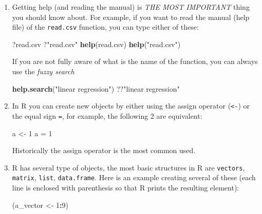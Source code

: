 \documentclass[]{book}
\newenvironment{Shaded}{\begin{snugshade}}{\end{snugshade}}
\newcommand{\DecValTok}[1]{\textcolor[rgb]{0.00,0.00,0.81}{#1}}
\newcommand{\KeywordTok}[1]{\textcolor[rgb]{0.13,0.29,0.53}{\textbf{#1}}}
\newcommand{\NormalTok}[1]{#1}
\newcommand{\OperatorTok}[1]{\textcolor[rgb]{0.81,0.36,0.00}{\textbf{#1}}}
\newcommand{\StringTok}[1]{\textcolor[rgb]{0.31,0.60,0.02}{#1}}
\begin{document}
\begin{enumerate}
\def\labelenumi{\arabic{enumi}.}
\setcounter{enumi}{-1}
\item
  Getting help (and reading the manual) is \emph{THE MOST IMPORTANT} thing you should know about. For example, if you want to read the manual (help file) of the \texttt{read.csv} function, you can type either of these:

\begin{Shaded}
\begin{Highlighting}[]
\NormalTok{?read.csv}
\NormalTok{?}\StringTok{"read.csv"}
\KeywordTok{help}\NormalTok{(read.csv)}
\KeywordTok{help}\NormalTok{(}\StringTok{"read.csv"}\NormalTok{)}
\end{Highlighting}
\end{Shaded}

  If you are not fully aware of what is the name of the function, you can always use the \emph{fuzzy search}

\begin{Shaded}
\begin{Highlighting}[]
\KeywordTok{help.search}\NormalTok{(}\StringTok{"linear regression"}\NormalTok{)}
\NormalTok{??}\StringTok{"linear regression"}
\end{Highlighting}
\end{Shaded}
\item
  In R you can create new objects by either using the assign operator (\texttt{\textless{}-}) or the equal sign \texttt{=}, for example, the following 2 are equivalent:

\begin{Shaded}
\begin{Highlighting}[]
\NormalTok{a <-}\StringTok{ }\DecValTok{1}
\NormalTok{a =}\StringTok{  }\DecValTok{1}
\end{Highlighting}
\end{Shaded}

  Historically the assign operator is the most common used.
\item
  R has several type of objects, the most basic structures in R are \texttt{vectors}, \texttt{matrix}, \texttt{list}, \texttt{data.frame}. Here is an example creating several of these (each line is enclosed with parenthesis so that R prints the resulting element):

\begin{Shaded}
\begin{Highlighting}[]
\NormalTok{(a_vector     <-}\StringTok{ }\DecValTok{1}\OperatorTok{:}\DecValTok{9}\NormalTok{)}
\end{Highlighting}
\end{Shaded}


\end{enumerate}
\end{document}
